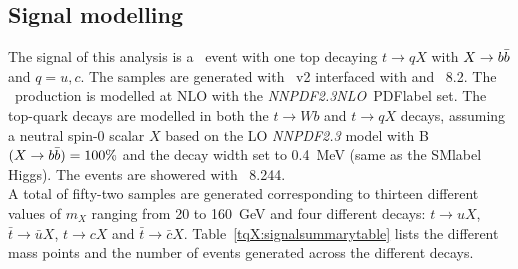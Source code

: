 

\subsection{Signal modelling}

The signal of this analysis is a \ttbar\ event with one top decaying $t\to qX$ with $X\to b\bar{b}$ and $q=u,c$. The samples are generated with \POWHEGBOX~v2 interfaced with \MADSPIN and \PYTHIA~8.2. The \ttbar\ production is modelled at NLO with the \textit{NNPDF2.3NLO}~\acrshort{PDFlabel} set. The top-quark decays are modelled in \MADSPIN both the $t\to Wb$ and $t\to qX$ decays, assuming a neutral spin-0 scalar $X$ based on the LO \textit{NNPDF2.3}  model with B$(X\to b\bar{b})=100\%$ and the decay width set to 0.4~MeV (same as the \acrshort{SMlabel} Higgs). The events are showered with \PYTHIA~8.244.\\

A total of fifty-two samples are generated corresponding to thirteen different values of $m_X$ ranging from 20 to 160~GeV and four different decays: $t\to uX$, $\bar{t}\to \bar{u}X$, $t\to cX$ and $\bar{t}\to \bar{c}X$. Table~\ref{tqX:signalsummarytable} lists the different mass points and the number of events generated across the different decays.\\

